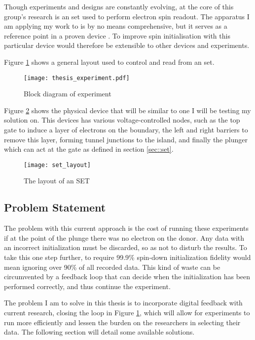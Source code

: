 \label{sec::experiment}
Though experiments and designs are constantly evolving, at the core of this group's research is an \gls{set} used to perform electron spin readout. The apparatus I am applying my work to is by no means comprehensive, but it serves as a reference point in a proven device \cite{morello2010single}. To improve spin initialisation with this particular device would therefore be extensible to other devices and experiments.

Figure \ref{fig::thesis_experiment} shows a general layout used to control and read from an \gls{set}.

\begin{figure}[htbp!]
	\centering
	\texttt{[image: thesis\_experiment.pdf]}
	\caption{Block diagram of experiment}
	\label{fig::thesis_experiment}
\end{figure}


Figure \ref{fig::set_layout} shows the physical device that will be similar to one I will be testing my solution on. This devices has various voltage-controlled nodes, such as the top gate to induce a layer of electrons on the boundary, the left and right barriers to remove this layer, forming tunnel junctions to the island, and finally the plunger which can act at the gate as defined in section \ref{sec::set}.

\begin{figure}[htbp!]
	\centering
	\texttt{[image: set\_layout]}
	\caption{The layout of an SET\cite{morello2010single}}
	\label{fig::set_layout}
\end{figure}

\subsection{Problem Statement}
The problem with this current approach is the cost of running these experiments if at the point of the plunge there was no electron on the donor. Any data with an incorrect initialization must be discarded, so as not to disturb the results. To take this one step further, to require 99.9\% spin-down initialization fidelity would mean ignoring over 90\% of all recorded data. This kind of waste can be circumvented by a feedback loop that can decide when the initialization has been performed correctly, and thus continue the experiment.

The problem I am to solve in this thesis is to incorporate digital feedback with current research, closing the loop in Figure \ref{fig::thesis_experiment}, which will allow for experiments to run more efficiently and lessen the burden on the researchers in selecting their data. The following section will detail some available solutions.

